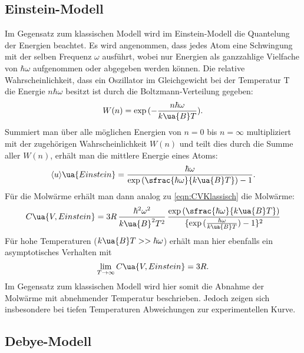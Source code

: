 \subsection{Einstein-Modell}

Im Gegensatz zum klassischen Modell wird im Einstein-Modell die Quantelung der Energien
beachtet. Es wird angenommen, dass jedes Atom eine Schwingung mit der selben Frequenz
$\omega$ ausführt, wobei nur Energien als ganzzahlige Vielfache von $\hbar\omega$
aufgenommen oder abgegeben werden können. Die relative Wahrscheinlichkeit, dass ein
Oszillator im Gleichgewicht bei der Temperatur T die Energie $n\hbar\omega$ besitzt
ist durch die Boltzmann-Verteilung gegeben:
\begin{equation}
  W(n) = \exp {(-\frac{n\hbar\omega}{k\ua{B}T})}.
\end{equation}
Summiert man über alle möglichen Energien von $n=0$ bis $n=\infty$ multipliziert
mit der zugehörigen Wahrscheinlichkeit $W(n)$ und teilt dies durch die Summe aller
$W(n)$, erhält man die mittlere Energie eines Atoms:
\begin{equation}
  \langle u \rangle\ua{Einstein} = \frac{\hbar\omega}{\exp{(\sfrac{\hbar\omega}{k\ua{B}T})-1}}.
\end{equation}
Für die Molwärme erhält man dann analog zu \eqref{eqn:CVKlassisch} die Molwärme:
\begin{equation}
  C\ua{V, Einstein} = 3R \,\frac{\hbar^2\omega^2}{k\ua{B}^2T^2} \,\frac{\exp{(\sfrac{\hbar\omega}{k\ua{B}T})}}{\{\exp{(\frac{\hbar\omega}{k\ua{B}T})}-1\}^2}
\end{equation}
Für hohe Temperaturen ($k\ua{B}T>>\hbar\omega$) erhält man hier ebenfalls ein
asymptotisches Verhalten mit
\begin{equation}
  \lim\limits_{T \rightarrow \infty}{C\ua{V,Einstein}} = 3R.
\end{equation}
Im Gegensatz zum klassischen Modell wird hier somit die Abnahme der Molwärme mit
abnehmender Temperatur beschrieben. Jedoch zeigen sich insbesondere bei tiefen
Temperaturen Abweichungen zur experimentellen Kurve.

\subsection{Debye-Modell}
\label{sec:debye}

